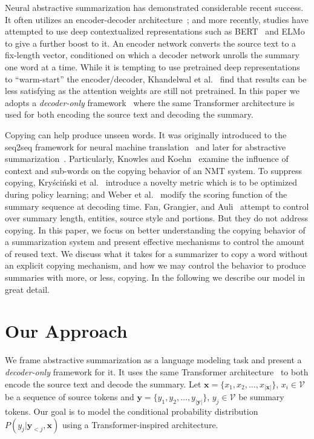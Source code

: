 \documentclass[letterpaper]{article} %
\begin{document}
Neural abstractive summarization has demonstrated considerable recent success.
It often utilizes an encoder-decoder architecture~\cite{Rush:2015,See:2017,Chen:2018:ACL,Lebanoff:2018,Celikyilmaz:2018}; and more recently, studies have attempted to use deep contextualized representations such as BERT~\cite{Devlin:2018} and ELMo~\cite{Peters:2018} to give a further boost to it. 
An encoder network converts the source text to a fix-length vector, conditioned on which a decoder network unrolls the summary one word at a time.
While it is tempting to use pretrained deep representations to ``warm-start'' the encoder/decoder, Khandelwal et al.~ find that results can be less satisfying as the attention weights are still not pretrained.
In this paper we adopts a \emph{decoder-only} framework~\cite{Dong:2019} where the same Transformer architecture is used for both encoding the source text and decoding the summary. 


Copying can help produce unseen words.
It was originally introduced to the seq2seq framework for neural machine translation~\cite{Gulcehre:2016} and later for abstractive summarization~\cite{See:2017}.
Particularly,
Knowles and Koehn~ examine the influence of context and sub-words on the copying behavior of an NMT system.
To suppress copying, Kryściński et al.~ introduce a novelty metric which is to be optimized during policy learning; and Weber et al.~ modify the scoring function of the summary sequence at decoding time. 
Fan, Grangier, and Auli~ attempt to control over summary length, entities, source style and portions.
But they do not address copying.
In this paper, we focus on better understanding the copying behavior of a summarization system and present effective mechanisms to control the amount of reused text.
We discuss what it takes for a summarizer to copy a word without an explicit copying mechanism, and how we may control the behavior to produce summaries with more, or less, copying.
In the following we describe our model in great detail. 



\section{Our Approach}
\label{sec:our_approach}


We frame abstractive summarization as a language modeling task and present a \emph{decoder-only} framework for it.
It uses the same Transformer architecture~\cite{Vaswani:2017} to both encode the source text and decode the summary.
Let $\mathbf{x} = \{x_1, x_2, \dots, x_{|\mathbf{x}|}\}$, $x_i \in \mathcal{V}$ be a sequence of source tokens and $\mathbf{y}=\{y_1, y_2, \dots, y_{|\mathbf{y}|}\}$, $y_j \in \mathcal{V}$ be summary tokens.
Our goal is to model the conditional probability distribution $P(y_j|\mathbf{y}_{<j}, \mathbf{x})$ using a Transformer-inspired architecture.
\end{document}
